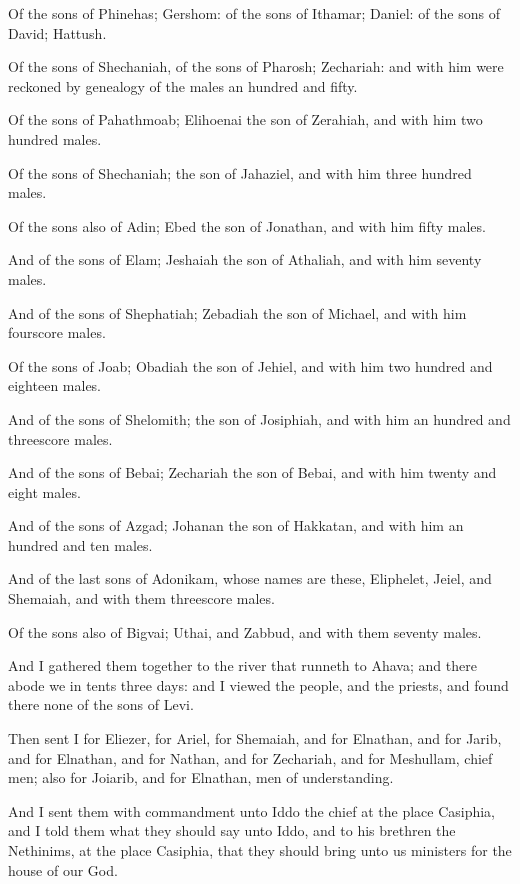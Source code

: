 \Verse Of the sons of Phinehas; Gershom: of the sons of Ithamar; Daniel: of the sons of David; Hattush.

\Verse Of the sons of Shechaniah, of the sons of Pharosh; Zechariah: and with him were reckoned by genealogy of the males an hundred and fifty.

\Verse Of the sons of Pahathmoab; Elihoenai the son of Zerahiah, and with him two hundred males.

\Verse Of the sons of Shechaniah; the son of Jahaziel, and with him three hundred males.

\Verse Of the sons also of Adin; Ebed the son of Jonathan, and with him fifty males.

\Verse And of the sons of Elam; Jeshaiah the son of Athaliah, and with him seventy males.

\Verse And of the sons of Shephatiah; Zebadiah the son of Michael, and with him fourscore males.

\Verse Of the sons of Joab; Obadiah the son of Jehiel, and with him two hundred and eighteen males.

\Verse And of the sons of Shelomith; the son of Josiphiah, and with him an hundred and threescore males.

\Verse And of the sons of Bebai; Zechariah the son of Bebai, and with him twenty and eight males.

\Verse And of the sons of Azgad; Johanan the son of Hakkatan, and with him an hundred and ten males.

\Verse And of the last sons of Adonikam, whose names are these, Eliphelet, Jeiel, and Shemaiah, and with them threescore males.

\Verse Of the sons also of Bigvai; Uthai, and Zabbud, and with them seventy males.

\Verse And I gathered them together to the river that runneth to Ahava; and there abode we in tents three days: and I viewed the people, and the priests, and found there none of the sons of Levi.

\Verse Then sent I for Eliezer, for Ariel, for Shemaiah, and for Elnathan, and for Jarib, and for Elnathan, and for Nathan, and for Zechariah, and for Meshullam, chief men; also for Joiarib, and for Elnathan, men of understanding.

\Verse And I sent them with commandment unto Iddo the chief at the place Casiphia, and I told them what they should say unto Iddo, and to his brethren the Nethinims, at the place Casiphia, that they should bring unto us ministers for the house of our God.

